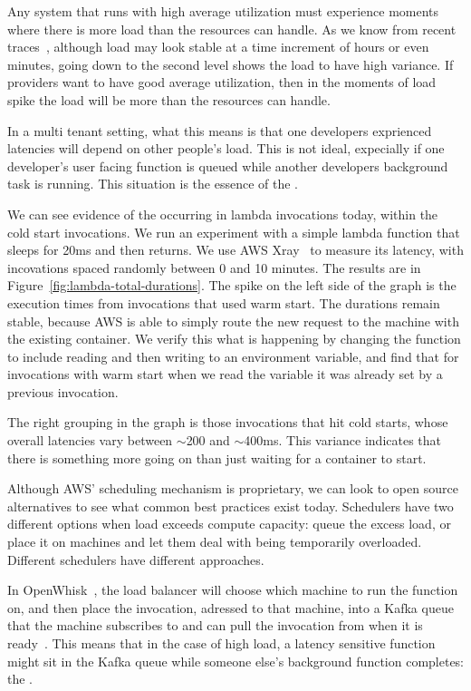 Any system that runs with high average utilization must experience moments where
there is more load than the resources can handle. As we know from recent
traces~\cite{prequal}, although load may look stable at a time increment of
hours or even minutes, going down to the second level shows the load to have
high variance. If providers want to have good average utilization, then in the
moments of load spike the load will be more than the resources can handle.

In a multi tenant setting, what this means is that one developers exprienced
latencies will depend on other people's load. This is not ideal, expecially if
one developer's user facing function is queued while another developers
background task is running. This situation is the essence of the \problem{}.

We can see evidence of the \problem{} occurring in lambda invocations today,
within the cold start invocations. We run an experiment with a simple lambda
function that sleeps for 20ms and then returns. We use AWS Xray~\cite{aws-xray}
to measure its latency, with incovations spaced randomly between 0 and 10
minutes. The results are in Figure~\ref{fig:lambda-total-durations}. The spike
on the left side of the graph is the execution times from invocations that used
warm start. The durations remain stable, because AWS is able to simply route the
new request to the machine with the existing container. We verify this what is
happening by changing the function to include reading and then writing to an
environment variable, and find that for invocations with warm start when we read
the variable it was already set by a previous invocation.

The right grouping in the graph is those invocations that hit cold starts, whose
overall latencies vary between $\sim$200 and $\sim$400ms. This variance
indicates that there is something more going on than just waiting for a
container to start.

Although AWS' scheduling mechanism is proprietary, we can look to open source
alternatives to see what common best practices exist today. Schedulers have two
different options when load exceeds compute capacity: queue the excess load, or
place it on machines and let them deal with being temporarily overloaded.
Different schedulers have different approaches. 

In OpenWhisk~\cite{openwhisk}, the load balancer will choose which machine to
run the function on, and then place the invocation, adressed to that machine,
into a Kafka queue that the machine subscribes to and can pull the invocation
from when it is ready~\cite{openwhisk-sched}. This means that in the case of
high load, a latency sensitive function might sit in the Kafka queue while
someone else's background function completes: the \problem{}. 

